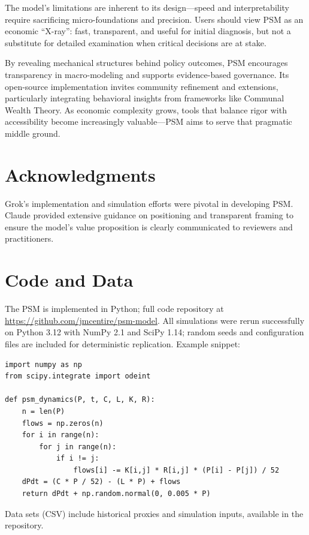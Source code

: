 \documentclass[11pt]{article}
\begin{document}
The model's limitations are inherent to its design---speed and interpretability require sacrificing micro-foundations and precision. Users should view PSM as an economic ``X-ray'': fast, transparent, and useful for initial diagnosis, but not a substitute for detailed examination when critical decisions are at stake.

By revealing mechanical structures behind policy outcomes, PSM encourages transparency in macro-modeling and supports evidence-based governance. Its open-source implementation invites community refinement and extensions, particularly integrating behavioral insights from frameworks like Communal Wealth Theory. As economic complexity grows, tools that balance rigor with accessibility become increasingly valuable---PSM aims to serve that pragmatic middle ground.

\section*{Acknowledgments}
Grok's implementation and simulation efforts were pivotal in developing PSM. Claude provided extensive guidance on positioning and transparent framing to ensure the model's value proposition is clearly communicated to reviewers and practitioners.



\appendix

\section{Code and Data}
The PSM is implemented in Python; full code repository at \url{https://github.com/jmcentire/psm-model}. All simulations were rerun successfully on Python 3.12 with NumPy 2.1 and SciPy 1.14; random seeds and configuration files are included for deterministic replication. Example snippet:

\begin{verbatim}
import numpy as np
from scipy.integrate import odeint

def psm_dynamics(P, t, C, L, K, R):
    n = len(P)
    flows = np.zeros(n)
    for i in range(n):
        for j in range(n):
            if i != j:
                flows[i] -= K[i,j] * R[i,j] * (P[i] - P[j]) / 52
    dPdt = (C * P / 52) - (L * P) + flows
    return dPdt + np.random.normal(0, 0.005 * P)
\end{verbatim}

Data sets (CSV) include historical proxies and simulation inputs, available in the repository. 
\end{document}
